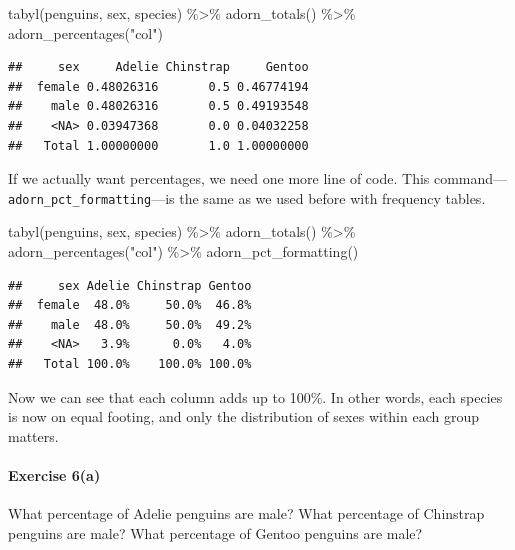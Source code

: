 \documentclass[
]{book}
\newenvironment{Shaded}{\begin{snugshade}}{\end{snugshade}}
\newcommand{\FunctionTok}[1]{\textcolor[rgb]{0.00,0.00,0.00}{#1}}
\newcommand{\NormalTok}[1]{#1}
\newcommand{\SpecialCharTok}[1]{\textcolor[rgb]{0.00,0.00,0.00}{#1}}
\newcommand{\StringTok}[1]{\textcolor[rgb]{0.31,0.60,0.02}{#1}}
\begin{document}
\begin{Shaded}
\begin{Highlighting}[]
\FunctionTok{tabyl}\NormalTok{(penguins, sex, species) }\SpecialCharTok{\%\textgreater{}\%}
    \FunctionTok{adorn\_totals}\NormalTok{() }\SpecialCharTok{\%\textgreater{}\%}
    \FunctionTok{adorn\_percentages}\NormalTok{(}\StringTok{"col"}\NormalTok{)}
\end{Highlighting}
\end{Shaded}

\begin{verbatim}
##     sex     Adelie Chinstrap     Gentoo
##  female 0.48026316       0.5 0.46774194
##    male 0.48026316       0.5 0.49193548
##    <NA> 0.03947368       0.0 0.04032258
##   Total 1.00000000       1.0 1.00000000
\end{verbatim}

If we actually want percentages, we need one more line of code. This command---\texttt{adorn\_pct\_formatting}---is the same as we used before with frequency tables.

\begin{Shaded}
\begin{Highlighting}[]
\FunctionTok{tabyl}\NormalTok{(penguins, sex, species) }\SpecialCharTok{\%\textgreater{}\%}
    \FunctionTok{adorn\_totals}\NormalTok{() }\SpecialCharTok{\%\textgreater{}\%}
    \FunctionTok{adorn\_percentages}\NormalTok{(}\StringTok{"col"}\NormalTok{) }\SpecialCharTok{\%\textgreater{}\%}
    \FunctionTok{adorn\_pct\_formatting}\NormalTok{()}
\end{Highlighting}
\end{Shaded}

\begin{verbatim}
##     sex Adelie Chinstrap Gentoo
##  female  48.0%     50.0%  46.8%
##    male  48.0%     50.0%  49.2%
##    <NA>   3.9%      0.0%   4.0%
##   Total 100.0%    100.0% 100.0%
\end{verbatim}

Now we can see that each column adds up to 100\%. In other words, each species is now on equal footing, and only the distribution of sexes within each group matters.

\hypertarget{exercise-6a}{%
\paragraph{Exercise 6(a)}\label{exercise-6a}}

What percentage of Adelie penguins are male? What percentage of Chinstrap penguins are male? What percentage of Gentoo penguins are male?
\end{document}

